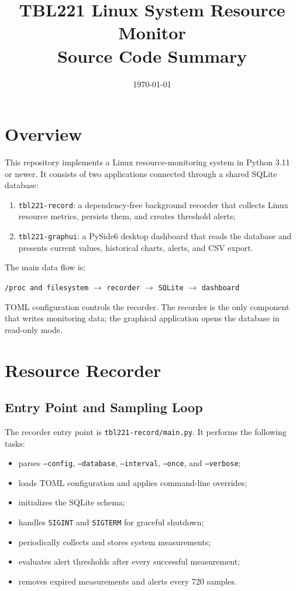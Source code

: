\documentclass[11pt,a4paper]{article}
\title{TBL221 Linux System Resource Monitor\\Source Code Summary}
\author{}
\date{\today}
\begin{document}
\maketitle
\tableofcontents
\newpage

\section{Overview}

This repository implements a Linux resource-monitoring system in Python 3.11 or newer. It consists of two applications connected through a shared SQLite database:

\begin{enumerate}
  \item \texttt{tbl221-record}: a dependency-free background recorder that collects Linux resource metrics, persists them, and creates threshold alerts;
  \item \texttt{tbl221-graphui}: a PySide6 desktop dashboard that reads the database and presents current values, historical charts, alerts, and CSV export.
\end{enumerate}

The main data flow is:

\begin{center}
\texttt{/proc and filesystem} $\longrightarrow$ \texttt{recorder} $\longrightarrow$ \texttt{SQLite} $\longrightarrow$ \texttt{dashboard}
\end{center}

TOML configuration controls the recorder. The recorder is the only component that writes monitoring data; the graphical application opens the database in read-only mode.

\section{Resource Recorder}

\subsection{Entry Point and Sampling Loop}

The recorder entry point is \texttt{tbl221-record/main.py}. It performs the following tasks:

\begin{itemize}
  \item parses \texttt{--config}, \texttt{--database}, \texttt{--interval}, \texttt{--once}, and \texttt{--verbose};
  \item loads TOML configuration and applies command-line overrides;
  \item initializes the SQLite schema;
  \item handles \texttt{SIGINT} and \texttt{SIGTERM} for graceful shutdown;
  \item periodically collects and stores system measurements;
  \item evaluates alert thresholds after every successful measurement;
  \item removes expired measurements and alerts every 720 samples.
\end{itemize}
\end{document}

